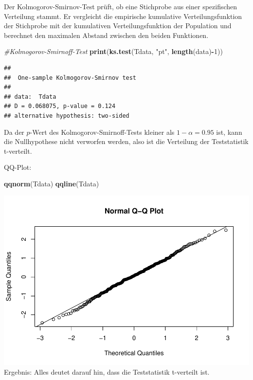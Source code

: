 \documentclass[]{article}
\newenvironment{Shaded}{\begin{snugshade}}{\end{snugshade}}
\newcommand{\CommentTok}[1]{\textcolor[rgb]{0.56,0.35,0.01}{\textit{#1}}}
\newcommand{\DecValTok}[1]{\textcolor[rgb]{0.00,0.00,0.81}{#1}}
\newcommand{\KeywordTok}[1]{\textcolor[rgb]{0.13,0.29,0.53}{\textbf{#1}}}
\newcommand{\NormalTok}[1]{#1}
\newcommand{\OperatorTok}[1]{\textcolor[rgb]{0.81,0.36,0.00}{\textbf{#1}}}
\newcommand{\StringTok}[1]{\textcolor[rgb]{0.31,0.60,0.02}{#1}}
\begin{document}
Der Kolmogorov-Smirnov-Test prüft, ob eine Stichprobe aus einer spezifischen Verteilung stammt.
Er vergleicht die empirische kumulative Verteilungsfunktion der Stichprobe mit der kumulativen
Verteilungsfunktion der Population und berechnet den maximalen Abstand zwischen den beiden Funktionen.

\begin{Shaded}
\begin{Highlighting}[]
\CommentTok{#Kolmogorov-Smirnoff-Test}
\KeywordTok{print}\NormalTok{(}\KeywordTok{ks.test}\NormalTok{(Tdata, }\StringTok{"pt"}\NormalTok{, }\KeywordTok{length}\NormalTok{(data)}\OperatorTok{-}\DecValTok{1}\NormalTok{))}
\end{Highlighting}
\end{Shaded}

\begin{verbatim}
## 
##  One-sample Kolmogorov-Smirnov test
## 
## data:  Tdata
## D = 0.068075, p-value = 0.124
## alternative hypothesis: two-sided
\end{verbatim}

Da der \(p\)-Wert des Kolmogorov-Smirnoff-Tests kleiner als \(1-\alpha=0.95\) ist, kann die Nullhypothese nicht verworfen werden,
also ist die Verteilung der Teststatistik t-verteilt.

QQ-Plot:

\begin{Shaded}
\begin{Highlighting}[]
\KeywordTok{qqnorm}\NormalTok{(Tdata)}
\KeywordTok{qqline}\NormalTok{(Tdata)}
\end{Highlighting}
\end{Shaded}

\includegraphics{Test_files/figure-latex/unnamed-chunk-7-1.pdf}
Ergebnis: Alles deutet darauf hin, dass die Teststatistik t-verteilt ist.
\end{document}
